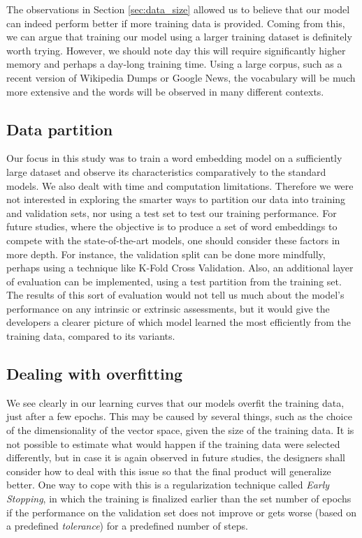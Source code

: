The observations in Section \ref{sec:data_size} allowed us to believe that our model can indeed perform better if more training data is provided. Coming from this, we can argue that training our model using a larger training dataset is definitely worth trying. However, we should note day this will require significantly higher memory and perhaps a day-long training time. Using a large corpus, such as a recent version of Wikipedia Dumps or Google News, the vocabulary will be much more extensive and the words will be observed in many different contexts.

\subsection{Data partition}

Our focus in this study was to train a word embedding model on a sufficiently large dataset and observe its characteristics comparatively to the standard models. We also dealt with time and computation limitations. Therefore we were not interested in exploring the smarter ways to partition our data into training and validation sets, nor using a test set to test our training performance. For future studies, where the objective is to produce a set of word embeddings to compete with the state-of-the-art models, one should consider these factors in more depth. For instance, the validation split can be done more mindfully, perhaps using a technique like K-Fold Cross Validation. Also, an additional layer of evaluation can be implemented, using a test partition from the training set. The results of this sort of evaluation would not tell us much about the model's performance on any intrinsic or extrinsic assessments, but it would give the developers a clearer picture of which model learned the most efficiently from the training data, compared to its variants.

\subsection{Dealing with overfitting}
We see clearly in our learning curves that our models overfit the training data, just after a few epochs. This may be caused by several things, such as the choice of the dimensionality of the vector space, given the size of the training data. It is not possible to estimate what would happen if the training data were selected differently, but in case it is again observed in future studies, the designers shall consider how to deal with this issue so that the final product will generalize better. One way to cope with this is a regularization technique called \textit{Early Stopping}, in which the training is finalized earlier than the set number of epochs if the performance on the validation set does not improve or gets worse (based on a predefined \textit{tolerance}) for a predefined number of steps.

